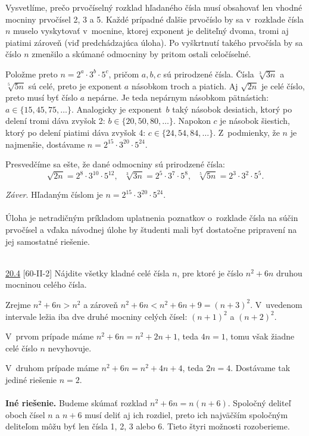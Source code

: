 \rieh Vysvetlíme, prečo prvočíselný rozklad hľadaného čísla musí obsahovať len vhodné mocniny prvočísel 2, 3 a 5. Každé prípadné ďalšie prvočíslo by sa v~rozklade čísla $n$ muselo vyskytovať v~mocnine, ktorej exponent je deliteľný dvoma, tromi aj piatimi zároveň (viď predchádzajúca úloha). Po vyškrtnutí takého prvočísla by sa číslo $n$ zmenšilo a skúmané odmocniny by pritom ostali celočíselné.

Položme preto $n = 2^a \cdot 3^b \cdot 5^c$, pričom $a, b, c$ sú prirodzené čísla. Čísla $\sqrt[3]{3n}$ a $\sqrt[5]{5n}$ sú celé, preto je exponent $a$ násobkom troch a piatich. Aj $\sqrt{2n}$ je celé číslo, preto musí byť číslo $a$ nepárne. Je teda nepárnym násobkom pätnástich: $a \in \{15, 45, 75, \ldots\}$. Analogicky je exponent~$b$ taký násobok desiatich, ktorý po delení tromi dáva zvyšok 2: $b \in \{20, 50, 80, \ldots\}$. Napokon $c$ je násobok šiestich, ktorý po delení piatimi dáva zvyšok 4: $c \in \{24, 54, 84, \ldots\}$. Z~podmienky, že $n$ je najmenšie, dostávame $n = 2^{15} \cdot3^{20} \cdot 5^{24}$.

Presvedčíme sa ešte, že dané odmocniny sú prirodzené čísla:
$$\sqrt{2n} = 2^8 \cdot 3^{10} \cdot 5^{12},\ \ \ \sqrt[3]{3n} = 2^5 \cdot 3^7 \cdot 5^8, \ \ \ \sqrt[5]{5n} = 2^3 \cdot 3^2 \cdot5^5.$$

\textit{Záver}. Hľadaným číslom je $n = 2^{15} \cdot 3^{20} \cdot 5^{24}$.\\
\\
\kom Úloha je netradičným príkladom uplatnenia poznatkov o~rozklade čísla na súčin prvočísel a vďaka návodnej úlohe by študenti mali byť dostatočne pripravení na jej samostatné riešenie.\\
\\
\begin{tcolorbox}[breakable,notitle,boxrule=0pt,colback=light-gray,colframe=light-gray]\ul{20.4} [60-II-2]
Nájdite všetky kladné celé čísla $n$, pre ktoré je číslo $n^2 + 6n$ druhou mocninou celého čísla.

\end{tcolorbox}

\rieh Zrejme $n^2 +6n > n^2$ a zároveň $n^2 +6n < n^2 +6n+9 = (n+3)^2$. V~uvedenom intervale ležia iba dve druhé mocniny celých čísel: $(n + 1)^2$ a $(n + 2)^2$.

V~prvom prípade máme $n^2 + 6n = n^2 + 2n + 1$, teda $4n = 1$, tomu však žiadne celé číslo $n$ nevyhovuje.

V~druhom prípade máme $n^2 + 6n = n^2 + 4n + 4$, teda $2n = 4$. Dostávame tak jediné riešenie $n = 2$.\\
\\
\textbf{Iné riešenie.} Budeme skúmať rozklad $n^2 + 6n = n(n+ 6)$. Spoločný deliteľ oboch čísel $n$ a $n + 6$ musí deliť aj ich rozdiel, preto ich najväčším spoločným deliteľom môžu byť len čísla 1, 2, 3 alebo 6. Tieto štyri možnosti rozoberieme.

